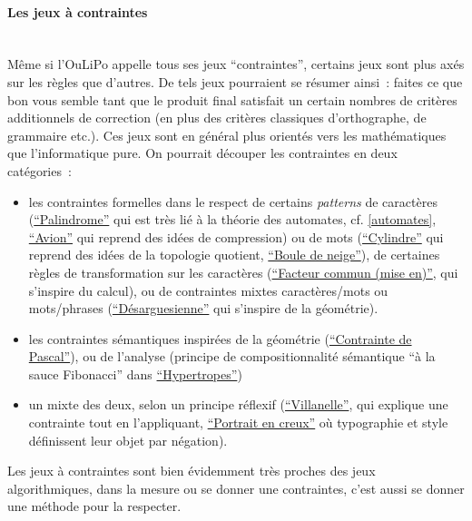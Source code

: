 \documentclass{article}
\newcommand{\subsubsubsection}[1]{\paragraph{#1}\mbox{}\\}
\begin{document}
				
				\subsubsubsection{Les jeux à contraintes}
					Même si l'OuLiPo appelle tous ses jeux ``contraintes'', certains jeux sont plus axés sur les règles que d'autres. De tels jeux pourraient se résumer ainsi~: faites ce que bon vous semble tant que le produit final satisfait un certain nombres de critères additionnels de correction (en plus des critères classiques d'orthographe, de grammaire etc.). Ces jeux sont en général plus orientés vers les mathématiques que l'informatique pure. On pourrait découper les contraintes en deux catégories~:
					\vspace{2mm}
					\begin{itemize}
						\item les contraintes formelles dans le respect de certains \textit{patterns} de caractères (\href{http://oulipo.net/fr/contraintes/palindrome}{``Palindrome''} qui est très lié à la théorie des automates, cf. \ref{automates}, \href{http://oulipo.net/fr/contraintes/avion}{``Avion''} qui reprend des idées de compression) ou de mots (\href{http://oulipo.net/fr/contraintes/cylindre}{``Cylindre''} qui reprend des idées de la topologie quotient, \href{http://oulipo.net/fr/contraintes/cylindre}{``Boule de neige''}), de certaines règles de transformation sur les caractères (\href{http://oulipo.net/fr/contraintes/facteur-commun-mise-en}{``Facteur commun (mise en)''}, qui s'inspire du calcul), 	ou de contraintes mixtes caractères/mots ou mots/phrases (\href{http://oulipo.net/fr/contraintes/desarguesienne}{``Désarguesienne''} qui s'inspire de la géométrie).
						\item les contraintes sémantiques inspirées de la géométrie (\href{http://oulipo.net/fr/contraintes/contrainte-de-pascal}{``Contrainte de Pascal''}), ou de l'analyse (principe de compositionnalité sémantique ``à la sauce Fibonacci'' dans \href{http://oulipo.net/fr/contraintes/hypertropes}{``Hypertropes''})
						\item un mixte des deux, selon un principe réflexif (\href{http://oulipo.net/fr/contraintes/villanelle}{``Villanelle''}, qui explique une contrainte tout en l'appliquant, \href{http://oulipo.net/fr/contraintes/portrait-en-creux}{``Portrait en creux''} où typographie et style définissent leur objet par négation).
					\end{itemize}
					\vspace{2mm}
					Les jeux à contraintes sont bien évidemment très proches des jeux algorithmiques, dans la mesure ou se donner une contraintes, c'est aussi se donner une méthode pour la respecter. 
				
\end{document}
